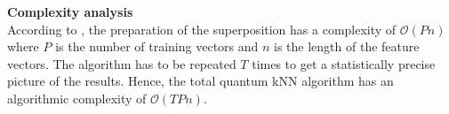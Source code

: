 \vspace{1cm}
\begin{greenbox}
\textbf{Complexity analysis}\\
\newline
According to , the preparation of the superposition has a complexity of $\mathcal{O}(Pn)$ where $P$ is the number of training vectors and $n$ is the length of the feature vectors. The algorithm has to be repeated $T$ times to get a statistically precise picture of the results. Hence, the total quantum kNN algorithm has an algorithmic complexity of $\mathcal{O}(TPn)$. 
\end{greenbox}

